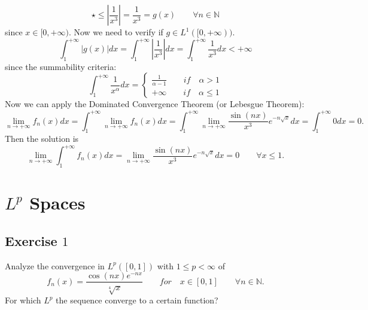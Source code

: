 \documentclass[a4paper, twoside, openany]{book}
\begin{document}
$$\star \leq |\frac{1}{x^3}| = \frac{1}{x^3} = g(x) \qquad \forall n \in \mathbb{N}$$
since $x \in [0, +\infty)$. Now we need to verify if $g \in L^1([0, +\infty))$. 
$$\int_1^{+\infty} |g(x)| dx = \int_1^{+\infty} |\frac{1}{x^3}| dx = \int_1^{+\infty} \frac{1}{x^3} dx < +\infty$$
since the summability criteria:
$$\int_1^{+\infty} \frac{1}{x^{\alpha}} dx = \begin{cases}
												\frac{1}{\alpha - 1} \qquad if \quad \alpha > 1 \\
												+\infty \qquad if \quad \alpha \leq 1
											\end{cases}$$
Now we can apply the Dominated Convergence Theorem (or Lebesgue Theorem):
$$\lim_{n \rightarrow +\infty} f_n(x) dx = \int_1^{+\infty} \lim_{n \rightarrow +\infty} f_n(x) dx = \int_1^{+\infty} \lim_{n \rightarrow +\infty} \frac{\sin(nx)}{x^3} e^{-n \sqrt{x}} dx = \int_1^{+\infty} 0 dx = 0.$$
Then the solution is
$$\lim_{n \rightarrow + \infty} \int_1^{+\infty} f_n(x) dx = \lim_{n \rightarrow +\infty} \frac{\sin(nx)}{x^3} e^{-n \sqrt{x}} dx = 0 \qquad \forall x \leq 1.$$
\clearpage
\chapter{$L^p$ Spaces}
\section*{Exercise $1$}
Analyze the convergence in $L^p([0, 1])$ with $1 \leq p < \infty$ of
$$f_n(x) = \frac{\cos(nx) e^{-n x}}{\sqrt[4]{x}} \qquad for \quad x \in [0, 1] \qquad \forall n \in \mathbb{N}.$$
For which $L^p$ the sequence converge to a certain function?
\end{document}
